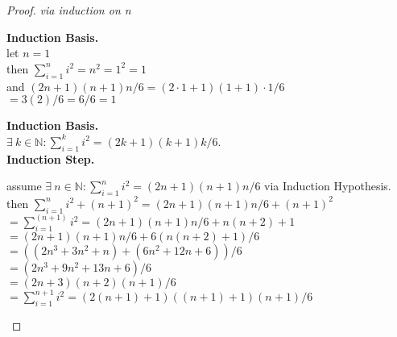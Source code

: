 \documentclass[12pt]{jhwhw}
\begin{document}
\solution
\begin{proof} \textit{via induction on n}

\bigbreak
\textbf{Induction Basis.} \\
	let $n=1$ \\
	then $\sum_{i=1}^{n}i^{2} = n^2 = 1^2 = 1$ \\
	and $(2n+1)(n+1)n/6 = (2\cdot 1+1)(1+1)\cdot 1/6$ \\
	$= 3(2)/6 = 6/6 = 1$

\bigbreak
\textbf{Induction Basis.} \\
	$\exists\ k\in \mathbb{N} : \sum_{i=1}^{k} i^{2} = (2k+1)(k+1)k/6$. \\

\bigbreak
\textbf{Induction Step.} \\
\begin{spacing}{1.4}
	assume $\exists\ n\in \mathbb{N} : \sum_{i=1}^{n} i^{2} = (2n+1)(n+1)n/6$ via Induction Hypothesis.\\
	then $\sum_{i=1}^{n}i^{2} + (n+1)^2 = (2n+1)(n+1)n/6 + (n+1)^2$ \\
	$ = \sum_{i=1}^{(n+1)}i^{2} = (2n+1)(n+1)n/6 + n(n+2)+1$ \\
	$ = (2n+1)(n+1)n/6 + 6(n(n+2)+1)/6$ \\
	$ = ((2n^3 + 3n^2 + n) + (6n^2 + 12n + 6))/6$ \\
	$ = (2n^3 + 9n^2 + 13n + 6)/6$ \\
	$ = (2n+3)(n+2)(n+1)/6$ \\
	$ = \sum_{i=1}^{n+1}i^{2} = (2(n+1)+1)((n+1)+1)(n+1)/6$ \\

\end{spacing}
\end{proof}
\end{document}
